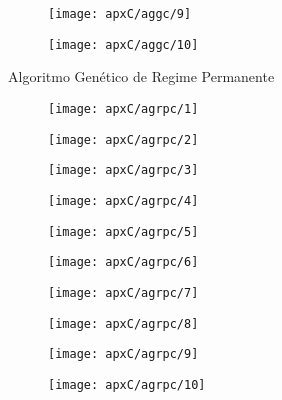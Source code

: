 \begin{figure}[H]
\centering

\texttt{[image: apxC/aggc/9]}

\end{figure}

\begin{figure}[H]
\centering

\texttt{[image: apxC/aggc/10]}

\end{figure}

Algoritmo Genético de Regime Permanente

\begin{figure}[H]
\centering

\texttt{[image: apxC/agrpc/1]}

\end{figure}

\begin{figure}[H]
\centering

\texttt{[image: apxC/agrpc/2]}

\end{figure}
\begin{figure}[H]
\centering

\texttt{[image: apxC/agrpc/3]}

\end{figure}
\begin{figure}[H]
\centering

\texttt{[image: apxC/agrpc/4]}

\end{figure}
\begin{figure}[H]
\centering

\texttt{[image: apxC/agrpc/5]}

\end{figure}
\begin{figure}[H]
\centering

\texttt{[image: apxC/agrpc/6]}

\end{figure}
\begin{figure}[H]
\centering

\texttt{[image: apxC/agrpc/7]}

\end{figure}
\begin{figure}[H]
\centering

\texttt{[image: apxC/agrpc/8]}

\end{figure}
\begin{figure}[H]
\centering

\texttt{[image: apxC/agrpc/9]}

\end{figure}
\begin{figure}[H]
\centering

\texttt{[image: apxC/agrpc/10]}

\end{figure}